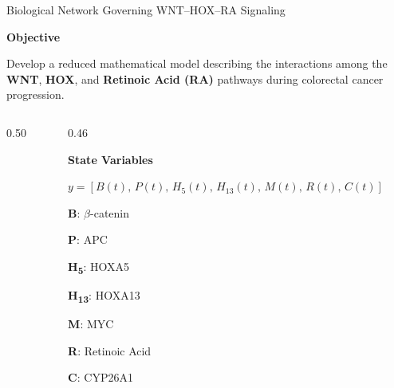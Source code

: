 \documentclass[aspectratio=169,11pt]{beamer}
\begin{document}
\begin{frame}{Biological Network Governing WNT--HOX--RA Signaling}
  \vspace{-0.30cm}
  {\fontsize{12.5}{16}\selectfont\bfseries\color{Snow}Objective\par}
  \vspace{0.10cm}
  {\fontsize{11}{14.5}\selectfont\color{Snow}%
   Develop a reduced mathematical model describing the interactions among the
   \textbf{WNT}, \textbf{HOX}, and \textbf{Retinoic Acid (RA)} pathways during
   colorectal cancer progression.\par}
  \vspace{0.10cm}

  \begin{columns}[T,totalwidth=\textwidth]
    \begin{column}{0.50\textwidth}
      \centering{}
    \end{column}
    \begin{column}{0.46\textwidth}
      {\fontsize{12}{14}\selectfont\bfseries\color{Snow}State Variables\par}
      \vspace{0.04cm}
      {\fontsize{9.5}{12}\selectfont\color{Snow}%
       $y=[B(t),\,P(t),\,H_5(t),\,H_{13}(t),\,M(t),\,R(t),\,C(t)]$\par}
      \vspace{0.12cm}
      {\fontsize{10.5}{13.2}\selectfont\color{Snow}
        \textbf{B}: $\beta$-catenin\par
        \textbf{P}: APC\par
        \textbf{H\textsubscript{5}}: HOXA5\par
        \textbf{H\textsubscript{13}}: HOXA13\par
        \textbf{M}: MYC\par
        \textbf{R}: Retinoic Acid\par
        \textbf{C}: CYP26A1\par}
    \end{column}
  \end{columns}
\end{frame}
\end{document}
